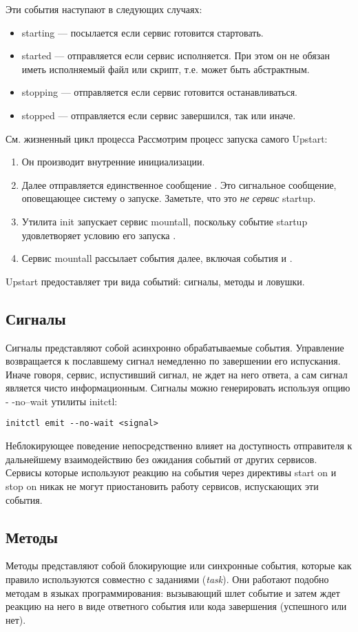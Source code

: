 Эти события наступают в следующих случаях: \begin{itemize}
\item starting --- посылается если сервис готовится стартовать.
\item started --- отправляется если сервис исполняется. При этом он не обязан иметь исполняемый файл или скрипт,  т.е. может быть абстрактным.
\item stopping --- отправляется если сервис готовится останавливаться.
\item stopped --- отправляется если сервис завершился, так или иначе. 
\end{itemize}
См. жизненный цикл процесса %
Рассмотрим процесс запуска самого Upstart: \begin{enumerate}
\item Он производит внутренние инициализации.
\item Далее отправляется единственное сообщение . Это сигнальное сообщение, оповещающее систему о запуске. Заметьте, что это \textit{не сервис} startup.
\item Утилита init запускает сервис mountall, поскольку событие startup удовлетворяет условию его запуска .
\item Сервис mountall рассылает события далее, включая события  и . 
\end{enumerate}
Upstart предоставляет три вида событий: сигналы, методы и ловушки.
\subsection*{Сигналы}
Сигналы представляют собой асинхронно обрабатываемые события. Управление возвращается к пославшему сигнал немедленно по завершении его испускания. Иначе говоря, сервис, испустивший сигнал, не ждет на него ответа, 
а сам сигнал является чисто информационным. Сигналы можно генерировать используя опцию \\- -no--wait утилиты initctl: \begin{verbatim}
initctl emit --no-wait <signal>
\end{verbatim} Неблокирующее поведение непосредственно влияет на доступность отправителя к дальнейшему взаимодействию без ожидания событий от других сервисов. Сервисы которые используют реакцию на события через директивы start on и stop on никак не могут приостановить работу сервисов, испускающих эти события.
\subsection*{Методы}
Методы представляют собой блокирующие или синхронные события, которые как правило используются совместно с заданиями (\textit{task}). Они работают подобно методам в языках программирования: вызывающий шлет событие 
и затем ждет реакцию на него в виде ответного события или кода завершения (успешного или нет).

